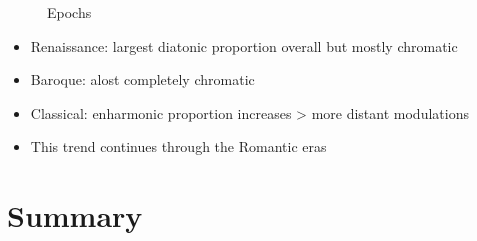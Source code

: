 \documentclass[letterpaper,10pt,english]{sphinxmanual}
\begin{document}
\noindent{}

\begin{figure}[htbp]
\centering
\capstart

\noindent{}
\caption{Epochs}\label{\detokenize{data-driven_music_history:id14}}\end{figure}
\begin{itemize}
\item {} 
Renaissance: largest diatonic proportion overall but mostly chromatic

\item {} 
Baroque: alost completely chromatic

\item {} 
Classical: enharmonic proportion increases \sphinxhyphen{}\textgreater{} more distant
modulations

\item {} 
This trend continues through the Romantic eras

\end{itemize}


\section{Summary}
\label{\detokenize{data-driven_music_history:summary}}
\end{document}
